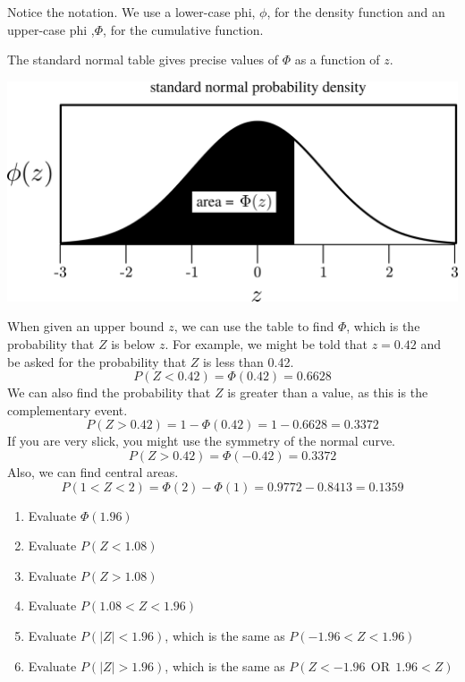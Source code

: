\documentclass[12pt,letterpaper]{article}
\begin{document}
Notice the notation. We use a lower-case phi, $\phi$, for the density function and an upper-case phi ,$\Phi$, for the cumulative function.

The standard normal table gives precise values of $\Phi$ as a function of $z$. 
\newpage
\begin{center}
\includegraphics[scale=.7]{area2.png}
\text{ }
\scriptsize 
\begin{multicols}{6}

\end{multicols}
\end{center}


\newpage
When given an upper bound $z$, we can use the table to find $\Phi$, which is the probability that $Z$ is below $z$. For example, we might be told that $z=0.42$ and be asked for the probability that $Z$ is less than 0.42.  $$P(Z<0.42) = \Phi(0.42) = 0.6628$$
We can also find the probability that $Z$ is greater than a value, as this is the complementary event.
$$P(Z>0.42) = 1-\Phi(0.42) = 1-0.6628 =  0.3372$$
If you are very slick, you might use the symmetry of the normal curve.
$$P(Z>0.42) = \Phi(-0.42) =  0.3372$$
Also, we can find central areas.
$$P(1 < Z < 2) = \Phi(2)-\Phi(1) = 0.9772-0.8413 = 0.1359$$

\begin{enumerate}
\item Evaluate $\Phi(1.96)$
\vfill
\item Evaluate $P(Z < 1.08)$
\vfill
\item Evaluate $P(Z > 1.08)$
\vfill
\item Evaluate $P(1.08 < Z < 1.96)$
\vfill
\item Evaluate $P(|Z| < 1.96)$, which is the same as $P(-1.96 < Z < 1.96)$
\vfill
\item Evaluate $P(|Z| > 1.96)$, which is the same as $P(Z < -1.96 ~~\text{OR}~~ 1.96<Z)$
\vfill
\end{enumerate}
\end{document}
